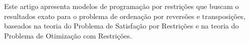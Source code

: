 \documentclass[12pt]{report} %
\begin{document}
Este artigo apresenta modelos de programação por restrições que buscam o
resultados exato para o problema de ordenação por reversões e
transposições, baseados na teoria do Problema de Satisfação por
Restrições e na teoria do Problema de Otimização com Restrições.





\end{document}
